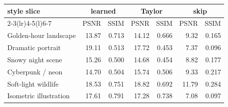 \begin{tabular}{@{}lrrrrrr@{}}
\toprule
style slice & \multicolumn{2}{c}{learned} & \multicolumn{2}{c}{Taylor} & \multicolumn{2}{c}{skip} \\
\cmidrule(lr){2-3}\cmidrule(lr){4-5}\cmidrule(l){6-7}
 & PSNR & SSIM & PSNR & SSIM & PSNR & SSIM \\
\midrule
Golden-hour landscape & 13.87 & 0.713 & 14.12 & 0.666 & 9.32 & 0.165 \\
Dramatic portrait & 19.11 & 0.513 & 17.72 & 0.453 & 7.37 & 0.096 \\
Snowy night scene & 15.26 & 0.500 & 14.68 & 0.454 & 8.82 & 0.177 \\
Cyberpunk / neon & 14.70 & 0.504 & 15.74 & 0.506 & 9.33 & 0.217 \\
Soft-light wildlife & 18.53 & 0.751 & 18.82 & 0.692 & 11.79 & 0.284 \\
Isometric illustration & 17.61 & 0.791 & 17.28 & 0.738 & 7.08 & 0.097 \\
\bottomrule
\end{tabular}
